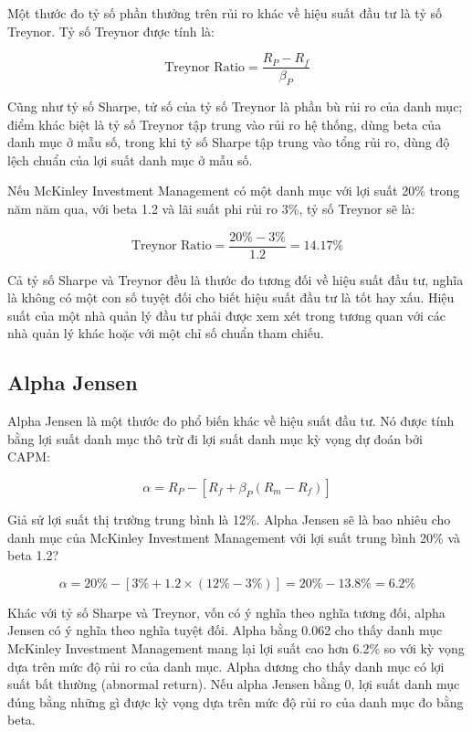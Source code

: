 Một thước đo tỷ số phần thưởng trên rủi ro khác về hiệu suất đầu tư là tỷ số Treynor. Tỷ số Treynor được tính là:

$$
\text{Treynor Ratio} = \frac{R_P - R_f}{\beta_P}
$$

Cũng như tỷ số Sharpe, tử số của tỷ số Treynor là phần bù rủi ro của danh mục; điểm khác biệt là tỷ số Treynor tập trung vào rủi ro hệ thống, dùng beta của danh mục ở mẫu số, trong khi tỷ số Sharpe tập trung vào tổng rủi ro, dùng độ lệch chuẩn của lợi suất danh mục ở mẫu số.

Nếu McKinley Investment Management có một danh mục với lợi suất 20\% trong năm năm qua, với beta 1.2 và lãi suất phi rủi ro 3\%, tỷ số Treynor sẽ là:

$$
\text{Treynor Ratio} = \frac{20\% - 3\%}{1.2} = 14.17\%
$$

Cả tỷ số Sharpe và Treynor đều là thước đo tương đối về hiệu suất đầu tư, nghĩa là không có một con số tuyệt đối cho biết hiệu suất đầu tư là tốt hay xấu. Hiệu suất của một nhà quản lý đầu tư phải được xem xét trong tương quan với các nhà quản lý khác hoặc với một chỉ số chuẩn tham chiếu.

\subsection*{Alpha Jensen}

Alpha Jensen là một thước đo phổ biến khác về hiệu suất đầu tư. Nó được tính bằng lợi suất danh mục thô trừ đi lợi suất danh mục kỳ vọng dự đoán bởi CAPM:

$$
\alpha = R_P - \left[ R_f + \beta_P (R_m - R_f) \right]
$$

Giả sử lợi suất thị trường trung bình là 12\%. Alpha Jensen sẽ là bao nhiêu cho danh mục của McKinley Investment Management với lợi suất trung bình 20\% và beta 1.2?

$$
\alpha = 20\% - \left[ 3\% + 1.2 \times (12\% - 3\%) \right] = 20\% - 13.8\% = 6.2\%
$$

Khác với tỷ số Sharpe và Treynor, vốn có ý nghĩa theo nghĩa tương đối, alpha Jensen có ý nghĩa theo nghĩa tuyệt đối. Alpha bằng 0.062 cho thấy danh mục McKinley Investment Management mang lại lợi suất cao hơn 6.2\% so với kỳ vọng dựa trên mức độ rủi ro của danh mục. Alpha dương cho thấy danh mục có lợi suất bất thường (abnormal return). Nếu alpha Jensen bằng 0, lợi suất danh mục đúng bằng những gì được kỳ vọng dựa trên mức độ rủi ro của danh mục đo bằng beta.

